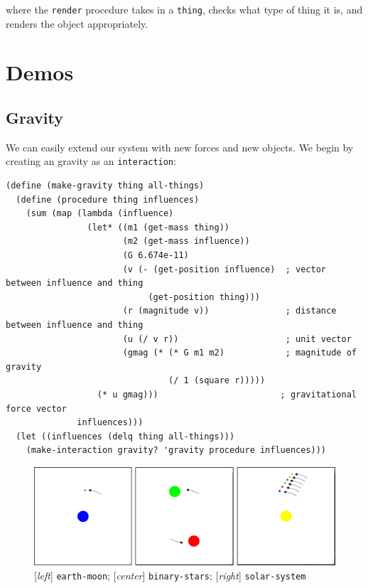 \documentclass{article}
\begin{document}
where the \texttt{render} procedure takes in a \texttt{thing}, checks what type of thing it is, and renders the object appropriately.

\section{Demos}
\subsection{Gravity}
We can easily extend our system with new forces and new objects. We begin by creating an gravity as an \texttt{interaction}:
{\small\begin{verbatim}
(define (make-gravity thing all-things)
  (define (procedure thing influences)
    (sum (map (lambda (influence)
                (let* ((m1 (get-mass thing))
                       (m2 (get-mass influence))
                       (G 6.674e-11)
                       (v (- (get-position influence)  ; vector between influence and thing
                            (get-position thing)))
                       (r (magnitude v))               ; distance between influence and thing
                       (u (/ v r))                     ; unit vector
                       (gmag (* (* G m1 m2)            ; magnitude of gravity
                                (/ 1 (square r)))))
                  (* u gmag)))                        ; gravitational force vector
              influences)))
  (let ((influences (delq thing all-things)))
    (make-interaction gravity? 'gravity procedure influences)))
\end{verbatim}}

\begin{figure}[h!]
  \centering
 \includegraphics[width=\textwidth,height=\textheight,keepaspectratio]{figs/gravity.png}
  \caption{[\textit{left}] \texttt{earth-moon}; [\textit{center}] \texttt{binary-stars}; [\textit{right}] \texttt{solar-system}}
  \label{figure:gravity}
\end{figure}
\end{document}
